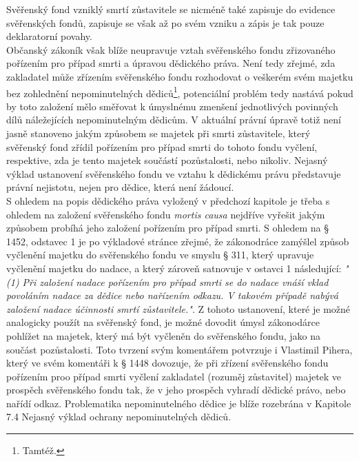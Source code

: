 \documentclass{article}
\begin{document}
Svěřenský fond vzniklý smrtí zůstavitele se nicméně také zapisuje do evidence svěřenských fondů, zapisuje se však až po svém vzniku a zápis je tak pouze deklaratorní povahy.\\


Občanský zákoník však blíže neupravuje vztah svěřenského fondu zřizovaného pořízením pro případ smrti a úpravou dědického práva. Není tedy zřejmé, zda zakladatel může zřízením svěřenského fondu rozhodovat o veškerém svém majetku bez zohlednění nepominutelných dědiců\footnote{Tamtéž.}, potenciální problém tedy nastává pokud by toto založení mělo směřovat k úmyslnému zmenšení jednotlivých povinných dílů náležejících nepominutelným dědicům. V aktuální právní úpravě totiž není jasně stanoveno jakým způsobem se majetek při smrti zůstavitele, který svěřenský fond zřídil pořízením pro případ smrti do tohoto fondu vyčlení, respektive, zda je tento majetek součástí pozůstalosti, nebo nikoliv. Nejasný výklad ustanovení svěřenského fondu ve vztahu k dědickému právu představuje právní nejistotu, nejen pro dědice, která není žádoucí. \\

S ohledem na popis dědického práva vyložený v předchozí kapitole je třeba s ohledem na založení svěřenského fondu \textit{mortis causa} nejdříve vyřešit jakým způsobem probíhá jeho založení pořízením pro případ smrti. S ohledem na § 1452, odstavec 1 je po výkladové stránce zřejmé, že zákonodráce zamýšlel způsob vyčlenění majetku do svěřenského fondu ve smyslu § 311, který upravuje vyčlenění majetku do nadace, a který zároveň satnovuje v ostavci 1 následující: \textit{"(1) Při založení nadace pořízením pro případ smrti se do nadace vnáší vklad povoláním nadace za dědice nebo nařízením odkazu. V takovém případě nabývá založení nadace účinnosti smrtí zůstavitele."}. Z tohoto ustanovení, které je možné analogicky použít na svěřenský fond, je možné dovodit úmysl zákonodárce pohlížet na majetek, který má být vyčleněn do svěřenského fondu, jako na součást pozůstalosti. Toto tvrzení svým komentářem potvrzuje i Vlastimil Pihera, který ve svém komentáři k § 1448 dovozuje, že při zřízení svěřenského fondu pořízením proo případ smrti vyčlení zakladatel (rozuměj zůstavitel) majetek ve prospěch svěřenského fondu tak, že v jeho prospěch vyhradí dědické právo, nebo nařídí odkaz. Problematika nepominutelného dědice je blíže rozebrána v Kapitole 7.4 Nejasný výklad ochrany nepominutelných dědiců.\\
\end{document}
